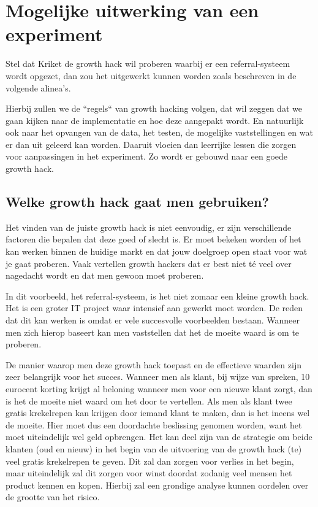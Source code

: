 \section{Mogelijke uitwerking van een experiment}
\label{sec:mogelijke-uitwerking-van-een-experiment}
Stel dat Kriket de growth hack wil proberen waarbij er een referral-systeem wordt opgezet, dan zou het uitgewerkt kunnen worden zoals beschreven in de volgende alinea's.

Hierbij zullen we de ``regels`` van growth hacking volgen, dat wil zeggen dat we gaan kijken naar de implementatie en hoe deze aangepakt wordt. En natuurlijk ook naar het opvangen van de data, het testen, de mogelijke vaststellingen en wat er dan uit geleerd kan worden. Daaruit vloeien dan leerrijke lessen die zorgen voor aanpassingen in het experiment. Zo wordt er gebouwd naar een goede growth hack.

\subsection{Welke growth hack gaat men gebruiken?}
\label{subsec:welke-growth-hack}
Het vinden van de juiste growth hack is niet eenvoudig, er zijn verschillende factoren die bepalen dat deze goed of slecht is. Er moet bekeken worden of het kan werken binnen de huidige markt en dat jouw doelgroep open staat voor wat je gaat proberen. Vaak vertellen growth hackers dat er best niet té veel over nagedacht wordt en dat men gewoon moet proberen. 

In dit voorbeeld, het referral-systeem, is het niet zomaar een kleine growth hack. Het is een groter IT project waar intensief aan gewerkt moet worden. De reden dat dit kan werken is omdat er vele succesvolle voorbeelden bestaan. Wanneer men zich hierop baseert kan men vaststellen dat het de moeite waard is om te proberen.

De manier waarop men deze growth hack toepast en de effectieve waarden zijn zeer belangrijk voor het succes. Wanneer men als klant, bij wijze van spreken, 10 eurocent korting krijgt al beloning wanneer men voor een nieuwe klant zorgt, dan is het de moeite niet waard om het door te vertellen. Als men als klant twee gratis krekelrepen kan krijgen door iemand klant te maken, dan is het ineens wel de moeite. Hier moet dus een doordachte beslissing genomen worden, want het moet uiteindelijk wel geld opbrengen. Het kan deel zijn van de strategie om beide klanten (oud en nieuw) in het begin van de uitvoering van de growth hack (te) veel gratis krekelrepen te geven. Dit zal dan zorgen voor verlies in het begin, maar uiteindelijk zal dit zorgen voor winst doordat zodanig veel mensen het product kennen en kopen. Hierbij zal een grondige analyse kunnen oordelen over de grootte van het risico.


